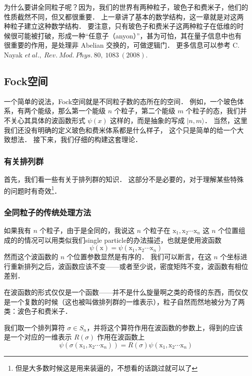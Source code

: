 
为什么要讲全同粒子呢？因为，我们的世界有两种粒子，玻色子和费米子，他们的性质截然不同，但又都很重要． 上一章讲了基本的数学结构，这一章就是对这两种粒子建立这种数学结构． 要注意，只有玻色子和费米子这两种粒子在低维的时候很可能被打破，形成一种“任意子（anyon）”，甚为可怕，其在量子信息中也有很重要的作用，是处理非 Abelian 交换的，可做逻辑门． 更多信息可以参考 C. Nayak $et\ al.,\ Rev.\ Mod.\ Phys.\ 80,\ 1083\ (2008)$.

\subsection{Fock空间}

一个简单的说法，Fock空间就是不同粒子数的态所在的空间． 例如，一个玻色体系，有两个能级，那么第一个能级 $n$ 个粒子，第二个能级 $m$ 个粒子的态，我们并不关心其具体的波函数形式 $\psi(x)$ 这样的，而是抽象的写成 $|n,m\rangle$． 当然，这里我们还没有明确的定义玻色和费米体系都是什么样子， 这个只是简单的给一个大致想法． 接下来，我们仔细的构建这套理论．

\subsubsection{有关排列群}

首先，我们看一些有关于排列群的知识． 这部分不是必要的，对于理解某些特殊的问题时有奇效\footnote{但是大多数时候这是用来装逼的，不想看的话跳过就可以了}．

\subsubsection{全同粒子的传统处理方法}

如果我有 $n$ 个粒子，由于是全同的，我说这 $n$ 个粒子在 ${\mathrm x}_1, {\mathrm x}_2 \cdots {\mathrm x}_n$ 这 $n$ 个位置组成的的情况可以用类似我们single particle的办法描述，也就是使用波函数
\begin{equation}
\psi({\mathrm x}) = \psi({\mathrm x}_1, {\mathrm x}_2\cdots{\mathrm x}_n)
\end{equation}
然而这个波函数的 $n$ 个位置参数显然是有序的． 我们可以断言，在这 $n$ 个坐标进行重新排列之后，波函数应该不变——或者至少说，密度矩阵不变，波函数有相位差别．

在波函数的形式仅仅是一个函数——并不是什么旋量啊之类的奇怪的东西，而仅仅是一个复数的时候（这也被叫做排列群的一维表示），粒子自然而然地被分为了两类：波色子和费米子．

我们取一个排列算符 $\sigma\in S_n$，并将这个算符作用在波函数的参数上，得到的应该是一个对应的一维表示 $R(\sigma)$ 作用在波函数上
\begin{equation}
\psi(\sigma ({\mathrm x}_1, {\mathrm x}_2\cdots{\mathrm x}_n)) = R(\sigma)\psi({\mathrm x}_1, {\mathrm x}_2\cdots{\mathrm x}_n)
\end{equation}

